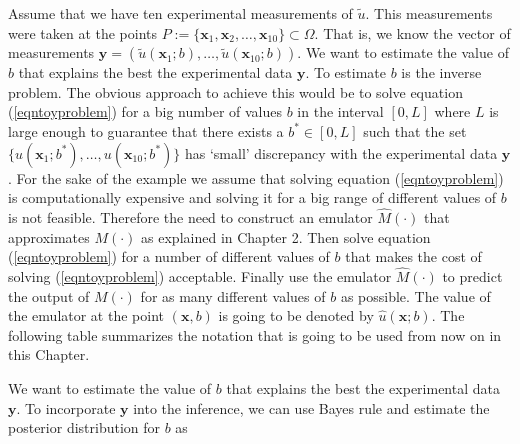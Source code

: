 \documentclass[12pt]{book}
\newcommand{\x}{\textbf{x}}
\newcommand{\y}{\textbf{y}}
\begin{document}
Assume that we have ten experimental measurements 
of $\tilde{u}$. This measurements were taken  at the points $P:=\{\x_{1},\x_{2},\ldots,\x_{10}\}\subset\Omega$. 
That is, we know the vector of measurements 
$\textbf{y}=(\tilde{u}(\x_{1};b),\ldots,\tilde{u}(\x_{10};b))$.
We want to estimate the value of $b$ that explains the best the experimental data $\textbf{y}$. To estimate $b$ is the inverse problem. 
The obvious approach to achieve this
would be to solve equation (\ref{eqntoyproblem}) for a big number of values $b$ in the interval $[0,L]$ where $L$ 
is large enough to guarantee that there exists a $b^{*}\in [0,L]$ such that the set $\{u(\x_{1};b^{*}),\ldots,u(\x_{10};b^{*})\}$
has `small' discrepancy with the experimental data $\y$. For the sake of the example we assume that solving
equation (\ref{eqntoyproblem}) is computationally expensive and solving it for a big range of different values of $b$
is not feasible. Therefore the need to construct an emulator $\hat{M}(\cdot)$ that approximates $M(\cdot)$ as
explained in  Chapter 2.  Then solve equation (\ref{eqntoyproblem}) for a number of 
different values of  $b$
that makes the cost of solving (\ref{eqntoyproblem})  acceptable. Finally use the emulator
$\hat{M}(\cdot)$ to predict the output of $M(\cdot)$ for as many different values of $b$ as possible. 
The value of the emulator at the point $(\x,b)$  is going to be denoted by $\hat{u}(\x;b)$. The following
table summarizes the notation that is going to be used from now on in this Chapter.

%
\newpage
We want to estimate the value of $b$ that explains the best the experimental data $\y$. 
To incorporate $\y$ into the inference, 
we can use Bayes rule and estimate the posterior distribution for $b$ as
\end{document}
